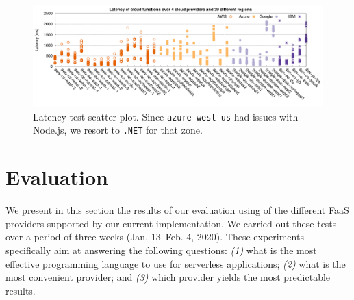 
\begin{figure}[!t]
\centering
\includegraphics[width=1.0\textwidth]{bilder/latency/latency}
\caption{Latency test scatter plot. Since \texttt{azure-west-us} had issues with Node.js, we resort to \texttt{.NET} for that zone.}
\label{fig:latency_plot}
\end{figure}

\section{Evaluation}
\label{sec:evaluation}

We present in this section the results of our evaluation using \sys of the different FaaS providers supported by our current implementation.
We carried out these tests over a period of three weeks (Jan. 13--Feb. 4, 2020).
These experiments specifically aim at answering the following questions: 
\emph{(1)} what is the most effective programming language to use for serverless applications;
\emph{(2)} what is the most convenient provider; and
\emph{(3)} which provider yields the most predictable results.

%

